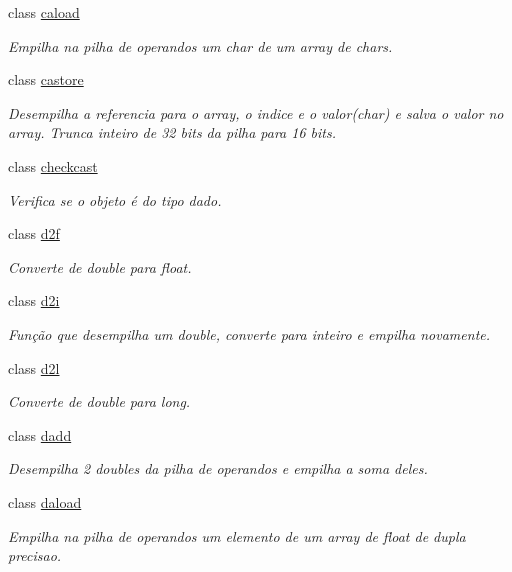 \begin{DoxyCompactItemize}
class \hyperlink{class_instruction_impl_1_1caload}{caload}
\begin{DoxyCompactList}\small\item\em Empilha na pilha de operandos um char de um array de chars. \end{DoxyCompactList}\item 
class \hyperlink{class_instruction_impl_1_1castore}{castore}
\begin{DoxyCompactList}\small\item\em Desempilha a referencia para o array, o indice e o valor(char) e salva o valor no array. Trunca inteiro de 32 bits da pilha para 16 bits. \end{DoxyCompactList}\item 
class \hyperlink{class_instruction_impl_1_1checkcast}{checkcast}
\begin{DoxyCompactList}\small\item\em Verifica se o objeto é do tipo dado. \end{DoxyCompactList}\item 
class \hyperlink{class_instruction_impl_1_1d2f}{d2f}
\begin{DoxyCompactList}\small\item\em Converte de double para float. \end{DoxyCompactList}\item 
class \hyperlink{class_instruction_impl_1_1d2i}{d2i}
\begin{DoxyCompactList}\small\item\em Função que desempilha um double, converte para inteiro e empilha novamente. \end{DoxyCompactList}\item 
class \hyperlink{class_instruction_impl_1_1d2l}{d2l}
\begin{DoxyCompactList}\small\item\em Converte de double para long. \end{DoxyCompactList}\item 
class \hyperlink{class_instruction_impl_1_1dadd}{dadd}
\begin{DoxyCompactList}\small\item\em Desempilha 2 doubles da pilha de operandos e empilha a soma deles. \end{DoxyCompactList}\item 
class \hyperlink{class_instruction_impl_1_1daload}{daload}
\begin{DoxyCompactList}\small\item\em Empilha na pilha de operandos um elemento de um array de float de dupla precisao. \end{DoxyCompactList}\item 

\end{DoxyCompactItemize}
